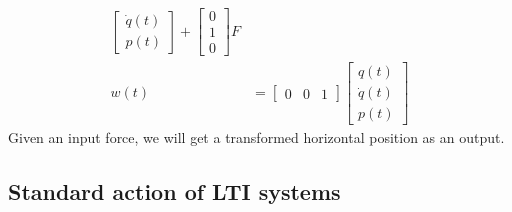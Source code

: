 \begin{example}
\begin{equation*}
\begin{aligned}
\begin{bmatrix}
                                                        \dot{q}(t) \\
                                                        {p}(t)
                                                    \end{bmatrix}+
            \begin{bmatrix}
                0 \\
                1 \\
                0
            \end{bmatrix} F \\
            w(t)            & =\begin{bmatrix}
                                   0 & 0 & 1
                               \end{bmatrix}\begin{bmatrix}
                                                {q}(t)     \\
                                                \dot{q}(t) \\
                                                {p}(t)
                                            \end{bmatrix}
        \end{aligned}
    \end{equation*}
    Given an input force, we will get a transformed horizontal position as an output.
\end{example}


\subsection{Standard action of LTI systems}

